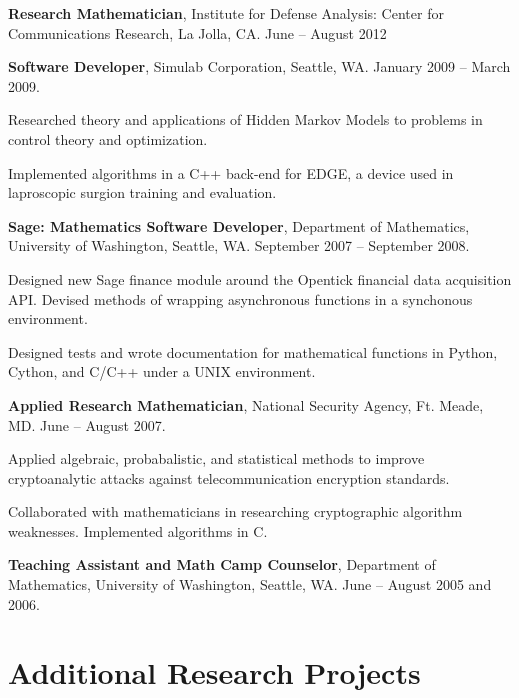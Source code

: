 \documentclass{article}
\begin{document}
\begin{itemize*}
  \setlength{\itemsep}{0pt}
  \item {\bf Research Mathematician}, Institute for Defense Analysis:
    Center for Communications Research, La Jolla, CA. June -- August
    2012
  \item {\bf Software Developer}, Simulab Corporation, Seattle,
    WA. January 2009 -- March 2009.
    \begin{itemize*}
    \item Researched theory and applications of Hidden Markov Models to problems
      in control theory and optimization.
    \item Implemented algorithms in a C++ back-end for EDGE, a device used in
      laproscopic surgion training and evaluation.
    \end{itemize*}
  \item {\bf Sage: Mathematics Software Developer}, Department of
    Mathematics, University of Washington, Seattle, WA. September 2007
    -- September 2008.
    \begin{itemize*}
      \item Designed new Sage finance module around the Opentick
        financial data acquisition API. Devised methods of wrapping
        asynchronous functions in a synchonous environment.
      \item Designed tests and wrote documentation for mathematical
        functions in Python, Cython, and C/C++ under a UNIX environment.
    \end{itemize*}
  \item {\bf Applied Research Mathematician}, National Security Agency,
    Ft. Meade, MD. June -- August 2007.
    \begin{itemize*}
      \item Applied algebraic, probabalistic, and statistical methods to
        improve cryptoanalytic attacks against telecommunication
        encryption standards.
      \item Collaborated with mathematicians in researching
        cryptographic algorithm weaknesses. Implemented algorithms in C.
    \end{itemize*}
  \item {\bf Teaching Assistant and Math Camp Counselor}, Department of
    Mathematics, University of Washington, Seattle, WA. June -- August
    2005 and 2006.
\end{itemize*}

\section*{Additional Research Projects}
\end{document}

